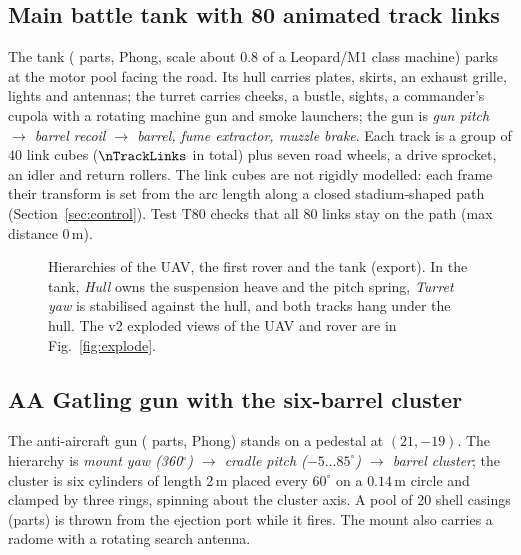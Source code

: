 \subsection{Main battle tank with 80 animated track links}
The tank (\partsTank{} parts, Phong, scale about 0.8 of a Leopard/M1 class machine) parks at the motor pool facing the road.
Its hull carries plates, skirts, an exhaust grille, lights and antennas; the turret carries cheeks, a bustle,
sights, a commander's cupola with a rotating machine gun and smoke launchers; the gun is
\emph{gun pitch $\to$ barrel recoil $\to$ barrel, fume extractor, muzzle brake}. Each track is a group of
$40$ link cubes ($\nTrackLinks$ in total) plus seven road wheels, a drive sprocket, an idler and return rollers. The link
cubes are not rigidly modelled: each frame their transform is set from the arc length along a closed stadium-shaped
path (Section~\ref{sec:control}). Test T80 checks that all 80 links stay on the path (max distance $0$\,m).


\begin{figure}[h]
\centering
\begin{minipage}[t]{0.31\linewidth}\vspace{0pt}\end{minipage}\hfill
\begin{minipage}[t]{0.31\linewidth}\vspace{0pt}\end{minipage}\hfill
\begin{minipage}[t]{0.35\linewidth}\vspace{0pt}\end{minipage}
\caption{Hierarchies of the UAV, the first rover and the tank (export). In the tank, \emph{Hull} owns the suspension heave and the pitch spring, \emph{Turret yaw} is
stabilised against the hull, and both tracks hang under the hull. The v2 exploded views of the UAV and rover are in Fig.~\ref{fig:explode}.}
\label{fig:tree-ground}
\end{figure}

\subsection{AA Gatling gun with the six-barrel cluster}
The anti-aircraft gun (\partsAa{} parts, Phong) stands on a pedestal at $(21,-19)$. The hierarchy is
\emph{mount yaw (360$^\circ$) $\to$ cradle pitch ($-5\ldots85^\circ$) $\to$ barrel cluster}; the cluster is six
cylinders of length 2\,m placed every $60^\circ$ on a $0.14$\,m circle and clamped by three rings, spinning about the
cluster axis. A pool of 20 shell casings (parts) is thrown from the ejection port while it fires. The mount also carries a
radome with a rotating search antenna.


